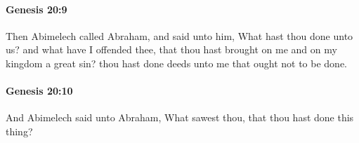 		\paragraph{Genesis 20:9} %
			\label{GENESIS-20-9}

			Then Abimelech called Abraham, and said unto him, What hast thou done unto us? and what have I offended thee, that thou hast brought on me and on my kingdom a great sin? thou hast done deeds unto me that ought not to be done.


		\paragraph{Genesis 20:10} %
			\label{GENESIS-20-10}

			And Abimelech said unto Abraham, What sawest thou, that thou hast done this thing?


